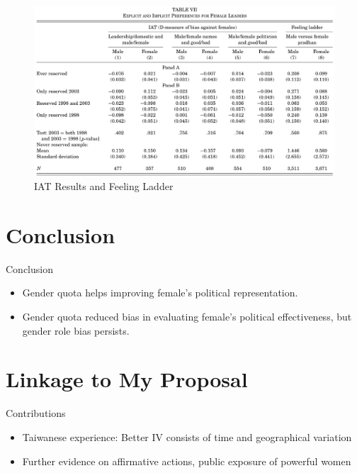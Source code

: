 \documentclass[
  10pt,
  ignorenonframetext,
  aspectratio=43,
]{beamer}
\providecommand{\tightlist}{%
  \setlength{\itemsep}{0pt}\setlength{\parskip}{0pt}}
\begin{document}
\begin{frame}
\begin{figure}
\centering
\includegraphics{20220523-qje-beaman-duflo-powerful-women.assets/table7-IAT results.png}
\caption{IAT Results and Feeling Ladder}
\end{figure}
\end{frame}

\hypertarget{conclusion}{%
\section{Conclusion}\label{conclusion}}

\begin{frame}{Conclusion}
\begin{itemize}
\tightlist
\item
  Gender quota helps improving female's political representation.
\item
  Gender quota reduced bias in evaluating female's political
  effectiveness, but gender role bias persists.
\end{itemize}
\end{frame}

\hypertarget{linkage-to-my-proposal}{%
\section{Linkage to My Proposal}\label{linkage-to-my-proposal}}

\begin{frame}{Contributions}
\protect\hypertarget{contributions}{}
\begin{itemize}
\tightlist
\item
  Taiwanese experience: Better IV consists of time and geographical
  variation
\item
  Further evidence on affirmative actions, public exposure of powerful
  women
\end{itemize}
\end{frame}
\end{document}

